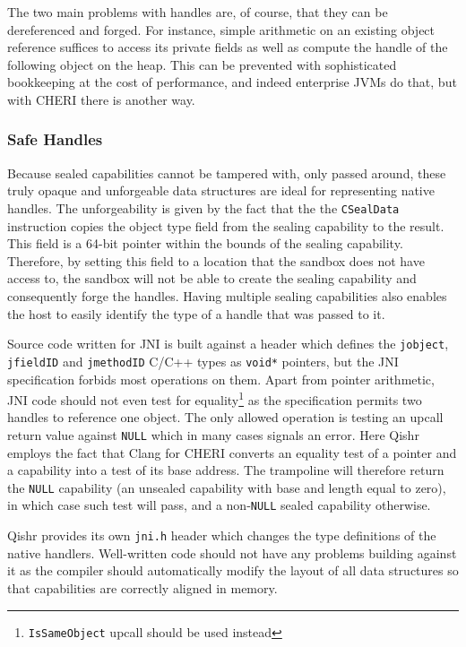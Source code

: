 \documentclass[a4paper,12pt,twoside,openright]{report}
\newcommand{\insn}[1]{\texttt{#1}}
\begin{document}
The two main problems with handles are, of course, that they can be dereferenced and forged. For instance, simple arithmetic on an existing object reference suffices to access its private fields as well as compute the handle of the following object on the heap. This can be prevented with sophisticated bookkeeping at the cost of performance, and indeed enterprise JVMs do that, but with CHERI there is another way. 

\subsubsection{Safe Handles}

Because sealed capabilities cannot be tampered with, only passed around, these truly opaque and unforgeable data structures are ideal for representing native handles. The unforgeability is given by the fact that the the \insn{CSealData} instruction copies the object type field from the sealing capability to the result. This field is a 64-bit pointer within the bounds of the sealing capability. Therefore, by setting this field to a location that the sandbox does not have access to, the sandbox will not be able to create the sealing capability and consequently forge the handles. Having multiple sealing capabilities also enables the host to easily identify the type of a handle that was passed to it.

Source code written for JNI is built against a header which defines the \texttt{jobject}, \texttt{jfieldID} and \texttt{jmethodID} C/C++ types as \texttt{void*} pointers, but the JNI specification forbids most operations on them. Apart from pointer arithmetic, JNI code should not even test for equality\footnote{\texttt{IsSameObject} upcall should be used instead} as the specification permits two handles to reference one object. The only allowed operation is testing an upcall return value against \texttt{NULL} which in many cases signals an error. Here Qishr employs the fact that Clang for CHERI converts an equality test of a pointer and a capability into a test of its base address. The trampoline will therefore return the \texttt{NULL} capability (an unsealed capability with base and length equal to zero), in which case such test will pass, and a non-\texttt{NULL} sealed capability otherwise. 

Qishr provides its own \texttt{jni.h} header which changes the type definitions of the native handlers. Well-written code should not have any problems building against it as the compiler should automatically modify the layout of all data structures so that capabilities are correctly aligned in memory.
\end{document}
